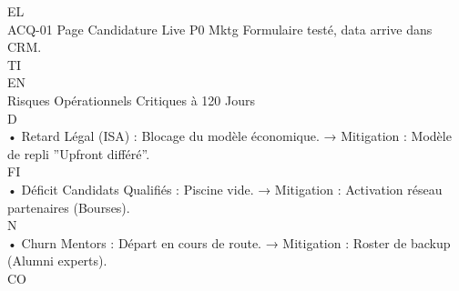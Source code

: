 \vspace{0.5em}
\vspace{0.5em}
EL\\
ACQ-01 Page Candidature Live          P0 Mktg          Formulaire testé, data arrive dans CRM.\\
\vspace{0.5em}
\vspace{0.5em}
\vspace{0.5em}
\vspace{0.5em}
TI\\
EN\\
Risques Opérationnels Critiques à 120 Jours\\
\vspace{0.5em}
\vspace{0.5em}
\vspace{0.5em}
\vspace{0.5em}
D\\
• Retard Légal (ISA) : Blocage du modèle économique. → Mitigation : Modèle de repli ”Upfront différé”.\\
\vspace{0.5em}
\vspace{0.5em}
\vspace{0.5em}
\vspace{0.5em}
FI\\
• Déficit Candidats Qualifiés : Piscine vide. → Mitigation : Activation réseau partenaires (Bourses).\\
\vspace{0.5em}
N\\
• Churn Mentors : Départ en cours de route. → Mitigation : Roster de backup (Alumni experts).\\
CO\\
\vspace{0.5em}
